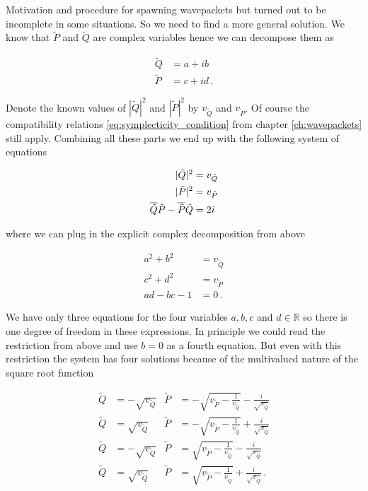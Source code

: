 \begin{chapter}{Motivation and procedure for spawning wavepackets}
but turned out to be incomplete in some situations. So we need to find a more
general solution. We know that $\tilde{P}$ and $\tilde{Q}$ are complex variables
hence we can decompose them as

\begin{equation}
\begin{split}
  \tilde{Q} & = a + ib \\
  \tilde{P} & = c + id \,.
\end{split}
\end{equation}

Denote the known values of $|\tilde{Q}|^2$ and $|\tilde{P}|^2$ by $v_{\tilde{Q}}$
and $v_{\tilde{P}}$. Of course the compatibility relations \eqref{eq:symplecticity_condition}
from chapter \ref{ch:wavepackets} still apply. Combining all these parts we
end up with the following system of equations

\begin{equation}
\begin{split}
  |\tilde{Q}|^2 & = v_{\tilde{Q}} \\
  |\tilde{P}|^2 & = v_{\tilde{P}} \\
  \overline{\tilde{Q}} \tilde{P} - \overline{\tilde{P}} \tilde{Q} & = 2i
\end{split}
\end{equation}

where we can plug in the explicit complex decomposition from above

\begin{equation}
\begin{split}
  a^2 + b^2 & = v_{\tilde{Q}} \\
  c^2 + d^2 & = v_{\tilde{P}} \\
  ad - bc -1 & = 0 \,.
\end{split}
\end{equation}

We have only three equations for the four variables $a, b, c \text{ and } d \in \mathbb{R}$
so there is one degree of freedom in these expressions. In principle we could read
the restriction from above and use $b=0$ as a fourth equation. But even with this
restriction the system has four solutions because of the multivalued nature of the
square root function

\begin{subequations} \label{eq:pq_possibilities}
\begin{align}
  \tilde{Q} & = -\sqrt{v_{\tilde{Q}}} & \tilde{P} & = -\sqrt{v_{\tilde{P}}-\frac{1}{v_{\tilde{Q}}}}-\frac{i}{\sqrt{v_{\tilde{Q}}}} \\
  \tilde{Q} & =  \sqrt{v_{\tilde{Q}}} & \tilde{P} & = -\sqrt{v_{\tilde{P}}-\frac{1}{v_{\tilde{Q}}}}+\frac{i}{\sqrt{v_{\tilde{Q}}}} \\
  \tilde{Q} & = -\sqrt{v_{\tilde{Q}}} & \tilde{P} & =  \sqrt{v_{\tilde{P}}-\frac{1}{v_{\tilde{Q}}}}-\frac{i}{\sqrt{v_{\tilde{Q}}}} \\
  \tilde{Q} & =  \sqrt{v_{\tilde{Q}}} & \tilde{P} & =  \sqrt{v_{\tilde{P}}-\frac{1}{v_{\tilde{Q}}}}+\frac{i}{\sqrt{v_{\tilde{Q}}}} \,. 
\end{align}
\end{subequations}
  

\end{chapter}
